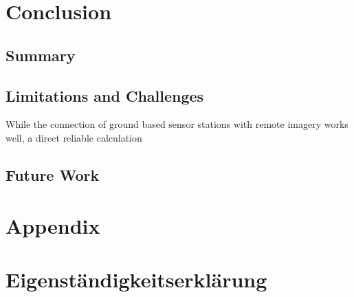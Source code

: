 \documentclass[12pt,a4paper, english]{article}
\begin{document}
\section{Conclusion}\label{sec:conclusion}
\subsection{Summary}

\subsection{Limitations and Challenges}
While the connection of ground based sensor stations with remote imagery works well, a direct reliable calculation 
% 
\subsection{Future Work}

\newpage
\section{Appendix}
%
%
\newpage
\printbibliography%
\newpage
\section*{Eigenständigkeitserklärung}

\end{document}
